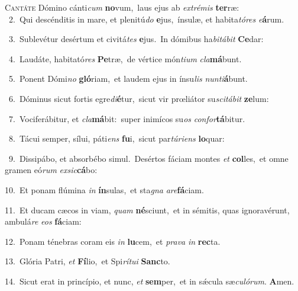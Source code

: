 \lettrine{\initial\textcolor{\initialcolor}{C}}{antáte} Dómino cánti\textit{cum} \textbf{no}\-vum,~\star laus ejus ab \textit{ex}\-\textit{tré}\textit{mis} \textbf{ter}\-ræ:\\
{\numbfont\textcolor{\numbcolor}{~2.}}~Qui descénditis in mare, et plenitú\textit{do} \textbf{e}\-jus,~\star ínsulæ, et habita\-\textit{tó}\-\textit{res} \textit{e}\-\textbf{á}rum.\par
{\numbfont\textcolor{\numbcolor}{~3.}}~Sublevétur desértum et civitá\textit{tes} \textbf{e}\-jus.~\star In dómibus ha\-\textit{bi}\-\textit{tá}\textit{bit} \textbf{Ce}\-dar:\par
{\numbfont\textcolor{\numbcolor}{~4.}}~Laudáte, habitató\textit{res} \textbf{Pe}\-træ,~\star de vértice món\-\textit{ti}\-\textit{um} \textit{cla}\-\textbf{má}bunt.\par
{\numbfont\textcolor{\numbcolor}{~5.}}~Ponent Dómi\textit{no} \textbf{gló}\-riam,~\star et laudem ejus in ínsu\textit{lis} \textit{nun}\-\textit{ti}\textbf{á}bunt.\par
{\numbfont\textcolor{\numbcolor}{~6.}}~Dóminus sicut fortis egre\-\textit{di}\-\textbf{é}tur,~\star sicut vir prœliátor su\-\textit{sci}\-\textit{tá}\textit{bit} \textbf{ze}\-lum:\par
{\numbfont\textcolor{\numbcolor}{~7.}}~Vociferábitur, et \textit{cla}\-\textbf{má}bit:~\star super inimícos su\textit{os} \textit{con}\-\textit{for}\textbf{tá}bitur.\par
{\numbfont\textcolor{\numbcolor}{~8.}}~Tácui semper, sílui, páti\textit{ens} \textbf{fu}\-i,~\star sicut par\-\textit{tú}\-\textit{ri}\textit{ens} \textbf{lo}\-quar:\par
{\numbfont\textcolor{\numbcolor}{~9.}}~Dissipábo, et absorbébo simul.~\dagger Desértos fáciam montes \textit{et} \textbf{col}\-les,~\star et omne gramen eó\textit{rum} \textit{ex}\-\textit{sic}\textbf{cá}bo:\par
{\numbfont\textcolor{\numbcolor}{10.}}~Et ponam flúmina \textit{in} \textbf{ín}\-sulas,~\star et sta\textit{gna} \textit{a}\-\textit{re}\textbf{fá}ciam.\par
{\numbfont\textcolor{\numbcolor}{11.}}~Et ducam cæcos in viam, \textit{quam} \textbf{né}\-sciunt,~\star et in sémitis, quas ignoravérunt, ambulá\textit{re} \textit{e}\-\textit{os} \textbf{fá}\-ciam:\par
{\numbfont\textcolor{\numbcolor}{12.}}~Ponam ténebras coram eis \textit{in} \textbf{lu}\-cem,~\star et \textit{pra}\-\textit{va} \textit{in} \textbf{rec}\-ta.\par
{\numbfont\textcolor{\numbcolor}{13.}}~Glória Patri, \textit{et} \textbf{Fí}\-lio,~\star et Spi\-\textit{rí}\-\textit{tu}\textit{i} \textbf{Sanc}\-to.\par
{\numbfont\textcolor{\numbcolor}{14.}}~Sicut erat in princípio, et nunc, \textit{et} \textbf{sem}\-per,~\star et in sǽcula sæ\-\textit{cu}\-\textit{ló}\textit{rum}. \textbf{A}\-men.\par

